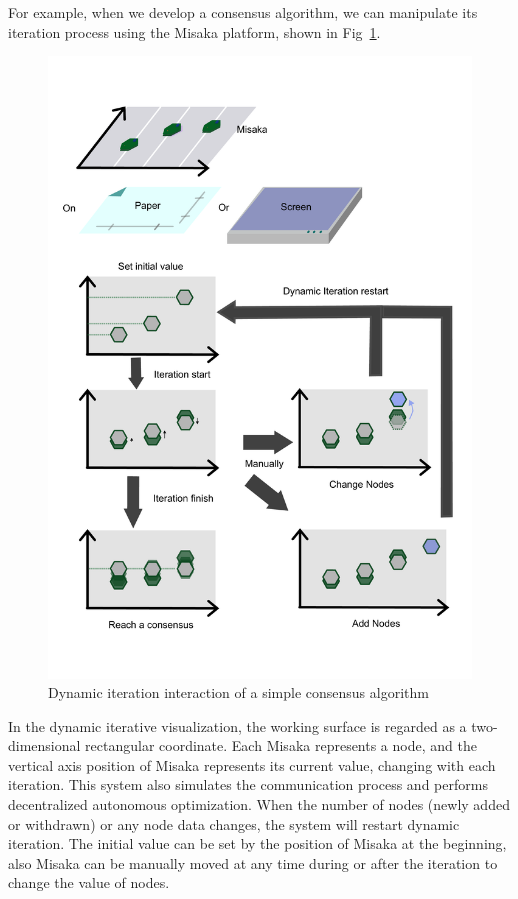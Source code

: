 \documentclass[sigconf]{acmart}
\begin{document}
For example, when we develop a consensus algorithm, we can manipulate its iteration process using the Misaka platform, shown in Fig~\ref{fig:Iteration}.

\begin{figure}[h]
  \centering
  \includegraphics[width=\linewidth]{Iteration.pdf}
  \caption{Dynamic iteration interaction of a simple consensus algorithm}
  \label{fig:Iteration}
\end{figure}

In the dynamic iterative visualization, the working surface is regarded as a two-dimensional rectangular coordinate. Each Misaka represents a node, and the vertical axis position of Misaka represents its current value, changing with each iteration. This system also simulates the communication process and performs decentralized autonomous optimization. When the number of nodes (newly added or withdrawn) or any node data changes, the system will restart dynamic iteration. The initial value can be set by the position of Misaka at the beginning, also Misaka can be manually moved at any time during or after the iteration to change the value of nodes.\cite{zhang2020misaka} 
\end{document}

